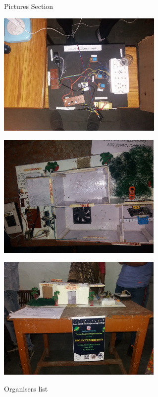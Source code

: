 \documentclass[12pt, a4 paper]{article}
\begin{document}
\begin{center}
\Huge Pictures Section

\medskip

\includegraphics[height=6cm]{image2.jpeg}

\medskip

\includegraphics[height=6cm]{image3.jpeg}

\medskip

\includegraphics[height=6cm]{image5.jpeg}

\end{center}

\newpage

\begin{center}
\huge Organisers list
\end{center}
\end{document}
